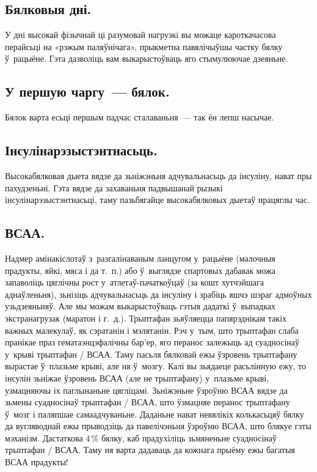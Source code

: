 \subsection{Бялковыя дні.}
У дні высокай фізычнай ці разумовай нагрузкі вы можаце кароткачасова перайсьці на «рэжым паляўнічага», прыкметна павялічыўшы частку бялку ў~рацыёне. Гэта дазволіць вам выкарыстоўваць яго стымулюючае дзеяньне.

\subsection{У першую чаргу~--- бялок.}
Бялок варта есьці першым падчас сталаваньня~--- так ён лепш насычае.

\subsection{Інсулінарэзыстэнтнасьць.}
Высокабялковая дыета вядзе да зьніжэньня адчувальнасьць да інсуліну, нават пры пахудзеньні. Гэта вядзе да захаваньня падвышанай рызыкі інсулінарэзыстэнтнасьці, таму пазьбягайце высокабялковых дыетаў працяглы час.

\subsection{ВСАА.}
Надмер амінакіслотаў з~разгалінаваным ланцугом у~рацыёне (малочныя прадукты, яйкі, мяса і да т.~п.) або ў~выглядзе спартовых дабавак можа запаволіць цяглічны рост у~атлетаў-пачаткоўцаў (за кошт хутчэйшага аднаўленьня), зьнізіць адчувальнасьць да інсуліну і зрабіць яшчэ шэраг адмоўных узьдзеяньняў. Але мы можам выкарыстоўваць гэтыя дадаткі ў~выпадках экстранагрузак (маратон і г.~д.). Трыптафан зьяўляецца папярэднікам такіх важных малекулаў, як сэратанін і мэлятанін. Рэч у~тым, што трыптафан слаба пранікае праз гематаэнцэфалічны бар'ер, яго перанос залежыць ад суадносінаў у~крыві трыптафан / ВСАА. Таму пасьля бялковай ежы ўзровень трыптафану вырастае ў~плазьме крыві, але ня ў~мозгу. Калі вы зьядаеце расьлінную ежу, то інсулін зьніжае ўзровень ВСАА (але не трыптафану) у~плазьме крыві, узмацняючы іх паглынаньне цягліцамі. Зьніжэньне ўзроўню ВСАА вядзе да зьмены суадносінаў трыптафан / ВСАА, што ўзмацняе перанос трыптафану ў~мозг і паляпшае самаадчуваньне. Даданьне нават невялікіх колькасьцяў бялку да вугляводнай ежы прыводзіць да павелічэньня ўзроўню ВСАА, што блякуе гэты мэханізм. Дастаткова 4\,\% бялку, каб прадухіліць зьмяненьне суадносінаў трыптафан / ВСАА. Таму ня варта дадаваць да кожнага прыёму ежы багатыя ВСАА прадукты!

